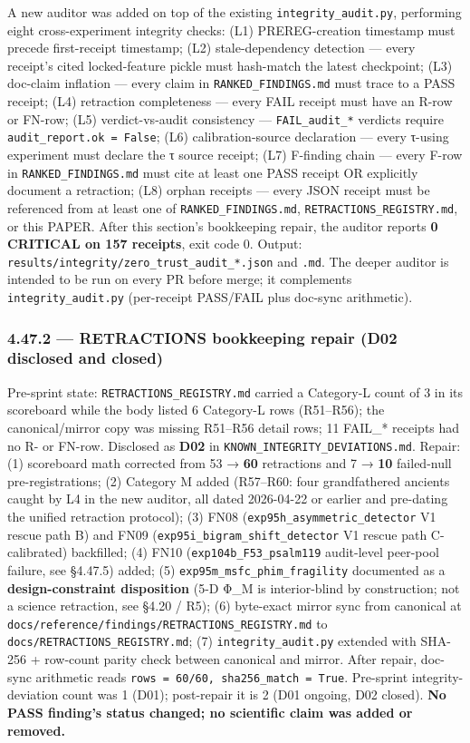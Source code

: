 \documentclass[
]{article}
\begin{document}
A new auditor was added on top of the existing
\texttt{integrity\_audit.py}, performing eight cross-experiment
integrity checks: (L1) PREREG-creation timestamp must precede
first-receipt timestamp; (L2) stale-dependency detection --- every
receipt's cited locked-feature pickle must hash-match the latest
checkpoint; (L3) doc-claim inflation --- every claim in
\texttt{RANKED\_FINDINGS.md} must trace to a PASS receipt; (L4)
retraction completeness --- every FAIL receipt must have an R-row or
FN-row; (L5) verdict-vs-audit consistency --- \texttt{FAIL\_audit\_*}
verdicts require \texttt{audit\_report.ok\ =\ False}; (L6)
calibration-source declaration --- every τ-using experiment must declare
the τ source receipt; (L7) F-finding chain --- every F-row in
\texttt{RANKED\_FINDINGS.md} must cite at least one PASS receipt OR
explicitly document a retraction; (L8) orphan receipts --- every JSON
receipt must be referenced from at least one of
\texttt{RANKED\_FINDINGS.md}, \texttt{RETRACTIONS\_REGISTRY.md}, or this
PAPER. After this section's bookkeeping repair, the auditor reports
\textbf{0 CRITICAL on 157 receipts}, exit code 0. Output:
\texttt{results/integrity/zero\_trust\_audit\_*.json} and \texttt{.md}.
The deeper auditor is intended to be run on every PR before merge; it
complements \texttt{integrity\_audit.py} (per-receipt PASS/FAIL plus
doc-sync arithmetic).

\subsubsection{4.47.2 --- RETRACTIONS bookkeeping repair (D02 disclosed
and
closed)}\label{retractions-bookkeeping-repair-d02-disclosed-and-closed}

Pre-sprint state: \texttt{RETRACTIONS\_REGISTRY.md} carried a Category-L
count of 3 in its scoreboard while the body listed 6 Category-L rows
(R51--R56); the canonical/mirror copy was missing R51--R56 detail rows;
11 FAIL\_* receipts had no R- or FN-row. Disclosed as \textbf{D02} in
\texttt{KNOWN\_INTEGRITY\_DEVIATIONS.md}. Repair: (1) scoreboard math
corrected from 53 → \textbf{60} retractions and 7 → \textbf{10}
failed-null pre-registrations; (2) Category M added (R57--R60: four
grandfathered ancients caught by L4 in the new auditor, all dated
2026-04-22 or earlier and pre-dating the unified retraction protocol);
(3) FN08 (\texttt{exp95h\_asymmetric\_detector} V1 rescue path B) and
FN09 (\texttt{exp95i\_bigram\_shift\_detector} V1 rescue path
C-calibrated) backfilled; (4) FN10 (\texttt{exp104b\_F53\_psalm119}
audit-level peer-pool failure, see §4.47.5) added; (5)
\texttt{exp95m\_msfc\_phim\_fragility} documented as a
\textbf{design-constraint disposition} (5-D Φ\_M is interior-blind by
construction; not a science retraction, see §4.20 / R5); (6) byte-exact
mirror sync from canonical at
\texttt{docs/reference/findings/RETRACTIONS\_REGISTRY.md} to
\texttt{docs/RETRACTIONS\_REGISTRY.md}; (7) \texttt{integrity\_audit.py}
extended with SHA-256 + row-count parity check between canonical and
mirror. After repair, doc-sync arithmetic reads
\texttt{rows\ =\ 60/60,\ sha256\_match\ =\ True}. Pre-sprint
integrity-deviation count was 1 (D01); post-repair it is 2 (D01 ongoing,
D02 closed). \textbf{No PASS finding's status changed; no scientific
claim was added or removed.}
\end{document}
